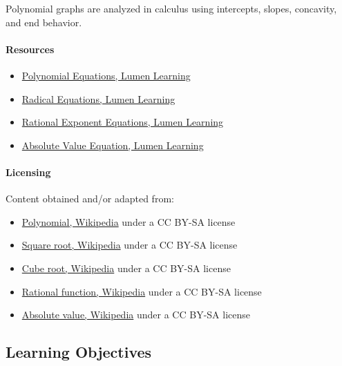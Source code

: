 Polynomial graphs are analyzed in calculus using intercepts, slopes, concavity, and end behavior.

\paragraph{Resources}

\begin{itemize}
    \item \href{https://courses.lumenlearning.com/waymakercollegealgebra/chapter/writing-formulas-for-polynomial-functions/}{Polynomial Equations, Lumen Learning}
    \item \href{https://courses.lumenlearning.com/suny-beginalgebra/chapter/7-3-1-solving-radical-equations/}{Radical Equations, Lumen Learning}
    \item \href{https://courses.lumenlearning.com/ivytech-collegealgebra/chapter/solving-equations-involving-rational-exponents/}{Rational Exponent Equations, Lumen Learning}
    \item \href{https://courses.lumenlearning.com/ivytech-collegealgebra/chapter/solve-an-absolute-value-equation/}{Absolute Value Equation, Lumen Learning}
\end{itemize}

\paragraph{Licensing}

Content obtained and/or adapted from:

\begin{itemize}
    \item \href{https://en.wikipedia.org/wiki/Polynomial}{Polynomial, Wikipedia} under a CC BY-SA license
    \item \href{https://en.wikipedia.org/wiki/Square_root}{Square root, Wikipedia} under a CC BY-SA license
    \item \href{https://en.wikipedia.org/wiki/Cube_root}{Cube root, Wikipedia} under a CC BY-SA license
    \item \href{https://en.wikipedia.org/wiki/Rational_function}{Rational function, Wikipedia} under a CC BY-SA license
    \item \href{https://en.wikipedia.org/wiki/Absolute_value}{Absolute value, Wikipedia} under a CC BY-SA license
\end{itemize}

\subsection{Learning Objectives}

